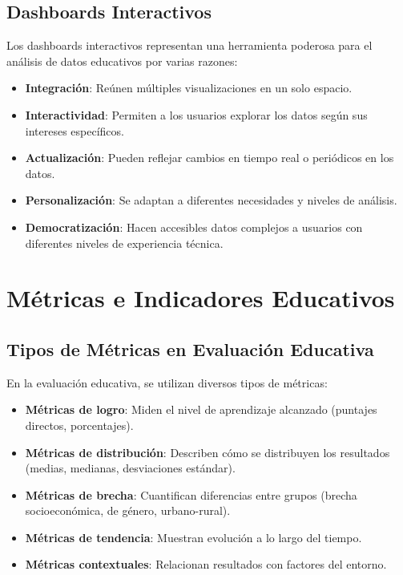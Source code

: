 \subsection{Dashboards Interactivos}
Los dashboards interactivos representan una herramienta poderosa para el análisis de datos educativos por varias razones:

\begin{itemize}
    \item \textbf{Integración}: Reúnen múltiples visualizaciones en un solo espacio.
    \item \textbf{Interactividad}: Permiten a los usuarios explorar los datos según sus intereses específicos.
    \item \textbf{Actualización}: Pueden reflejar cambios en tiempo real o periódicos en los datos.
    \item \textbf{Personalización}: Se adaptan a diferentes necesidades y niveles de análisis.
    \item \textbf{Democratización}: Hacen accesibles datos complejos a usuarios con diferentes niveles de experiencia técnica.
\end{itemize}

\section{Métricas e Indicadores Educativos}

\subsection{Tipos de Métricas en Evaluación Educativa}
En la evaluación educativa, se utilizan diversos tipos de métricas:

\begin{itemize}
    \item \textbf{Métricas de logro}: Miden el nivel de aprendizaje alcanzado (puntajes directos, porcentajes).
    \item \textbf{Métricas de distribución}: Describen cómo se distribuyen los resultados (medias, medianas, desviaciones estándar).
    \item \textbf{Métricas de brecha}: Cuantifican diferencias entre grupos (brecha socioeconómica, de género, urbano-rural).
    \item \textbf{Métricas de tendencia}: Muestran evolución a lo largo del tiempo.
    \item \textbf{Métricas contextuales}: Relacionan resultados con factores del entorno.
\end{itemize}

